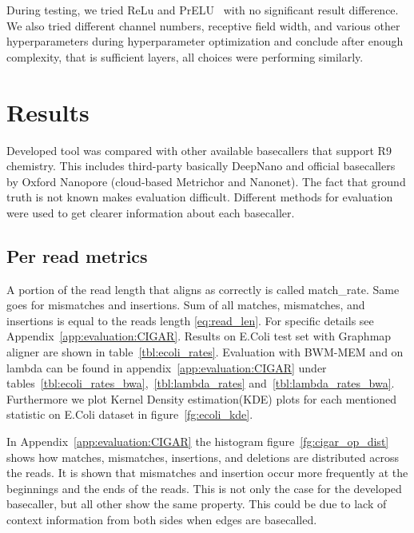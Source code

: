 \documentclass[runningheads,a4paper]{llncs}
\begin{document}
During testing, we tried ReLu and PrELU~\cite{prelu} with no significant result difference. We also tried different channel numbers, receptive field width, and various other hyperparameters during hyperparameter optimization and conclude after enough complexity, that is sufficient layers, all choices were performing similarly.

\section{Results}

Developed tool was compared with other available basecallers that support R9 chemistry. This includes third-party basically DeepNano and official basecallers by Oxford Nanopore (cloud-based Metrichor and Nanonet).
The fact that ground truth is not known makes evaluation difficult.
Different methods for evaluation were used to get clearer information about each basecaller.

\subsection{Per read metrics}
\label{subs:read_metrics}
A portion of the read length that aligns as correctly is called match\_rate. Same goes for mismatches and insertions.
Sum of all matches, mismatches, and insertions is equal to the reads length \ref{eq:read_len}. For specific details see Appendix~\ref{app:evaluation:CIGAR}. Results on E.Coli test set with Graphmap aligner are shown in table~\ref{tbl:ecoli_rates}. Evaluation with BWM-MEM and on lambda can be found in appendix~\ref{app:evaluation:CIGAR} under tables~\ref{tbl:ecoli_rates_bwa},~\ref{tbl:lambda_rates} and~\ref{tbl:lambda_rates_bwa}. Furthermore we plot Kernel Density estimation(KDE) plots for each mentioned statistic on E.Coli dataset in figure~\ref{fg:ecoli_kde}.

In Appendix~\ref{app:evaluation:CIGAR} the histogram figure~\ref{fg:cigar_op_dist} shows how matches, mismatches, insertions, and deletions are distributed across the reads. It is shown that mismatches and insertion occur more frequently at the beginnings and the ends of the reads. This is not only the case for the developed basecaller, but all other show the same property. This could be due to lack of context information from both sides when edges are basecalled.
\end{document}
